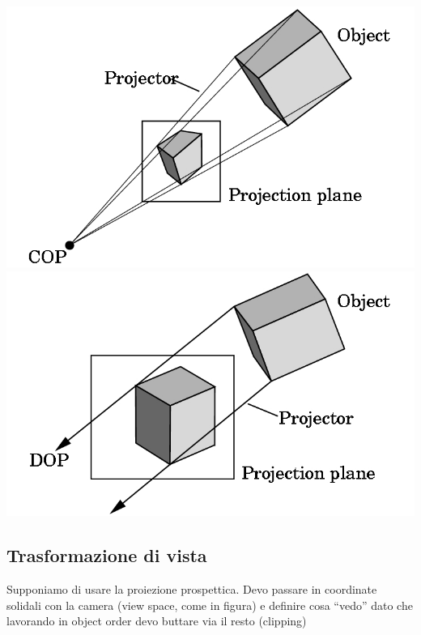 \documentclass[a4paper, 10pt]{article}
\begin{document}
		\begin{center}
			\includegraphics[scale=0.2]{pipelineg1}
			\hspace{1cm}
			\includegraphics[scale=0.2]{pipelineg2}
		\end{center}
	
	\subsection{Trasformazione di vista}
		Supponiamo di usare la proiezione prospettica. Devo passare in coordinate solidali con la camera (view space, come in figura) e definire cosa “vedo” dato che lavorando in object order devo buttare via il resto (clipping)
		
\end{document}
